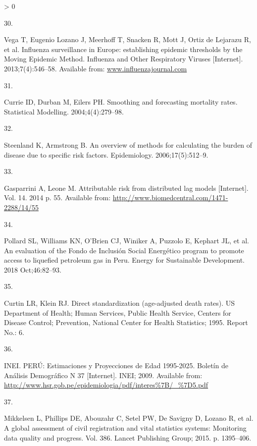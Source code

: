 \documentclass[
]{article}
\newlength{\cslhangindent}
\newlength{\csllabelwidth}
\newenvironment{CSLReferences}[2] %
 {%
  \setlength{\parindent}{0pt}
  \ifodd #1 \everypar{\setlength{\hangindent}{\cslhangindent}}\ignorespaces\fi
  \ifnum #2 > 0
  \setlength{\parskip}{#2\baselineskip}
  \fi
 }%
 {}
\newcommand{\CSLLeftMargin}[1]{\parbox[t]{\csllabelwidth}{#1}}
\newcommand{\CSLRightInline}[1]{\parbox[t]{\linewidth - \csllabelwidth}{#1}\break}
\begin{document}
\begin{CSLReferences}{0}{0}
\leavevmode\hypertarget{ref-Vega2013}{}%
\CSLLeftMargin{30. }
\CSLRightInline{Vega T, Eugenio Lozano J, Meerhoff T, Snacken R, Mott J, Ortiz de Lejarazu R, et al. {Influenza surveillance in Europe: establishing epidemic thresholds by the Moving Epidemic Method}. Influenza and Other Respiratory Viruses {[}Internet{]}. 2013;7(4):546--58. Available from: \href{https://www.influenzajournal.com}{www.influenzajournal.com}}

\leavevmode\hypertarget{ref-Currie2004}{}%
\CSLLeftMargin{31. }
\CSLRightInline{Currie ID, Durban M, Eilers PH. {Smoothing and forecasting mortality rates}. Statistical Modelling. 2004;4(4):279--98. }

\leavevmode\hypertarget{ref-Steenland2006}{}%
\CSLLeftMargin{32. }
\CSLRightInline{Steenland K, Armstrong B. {An overview of methods for calculating the burden of disease due to specific risk factors}. Epidemiology. 2006;17(5):512--9. }

\leavevmode\hypertarget{ref-Gasparrini2014}{}%
\CSLLeftMargin{33. }
\CSLRightInline{Gasparrini A, Leone M. {Attributable risk from distributed lag models} {[}Internet{]}. Vol. 14. 2014 p. 55. Available from: \url{http://www.biomedcentral.com/1471-2288/14/55}}

\leavevmode\hypertarget{ref-Pollard2018}{}%
\CSLLeftMargin{34. }
\CSLRightInline{Pollard SL, Williams KN, O'Brien CJ, Winiker A, Puzzolo E, Kephart JL, et al. {An evaluation of the Fondo de Inclusi{ó}n Social Energ{é}tico program to promote access to liquefied petroleum gas in Peru}. Energy for Sustainable Development. 2018 Oct;46:82--93. }

\leavevmode\hypertarget{ref-Curtin1995}{}%
\CSLLeftMargin{35. }
\CSLRightInline{Curtin LR, Klein RJ. {Direct standardization (age-adjusted death rates)}. US Department of Health; Human Services, Public Health Service, Centers for Disease Control; Prevention, National Center for Health Statistics; 1995. Report No.: 6. }

\leavevmode\hypertarget{ref-INEI2009}{}%
\CSLLeftMargin{36. }
\CSLRightInline{INEI. {PER{Ú}: Estimaciones y Proyecciones de Edad 1995-2025. Bolet{í}n de An{á}lisis Demogr{á}fico N{{}} 37} {[}Internet{]}. INEI; 2009. Available from: \url{http://www.hsr.gob.pe/epidemiologia/pdf/interes\%7B/_\%7D5.pdf}}

\leavevmode\hypertarget{ref-Mikkelsen2015}{}%
\CSLLeftMargin{37. }
\CSLRightInline{Mikkelsen L, Phillips DE, Abouzahr C, Setel PW, De Savigny D, Lozano R, et al. {A global assessment of civil registration and vital statistics systems: Monitoring data quality and progress}. Vol. 386. Lancet Publishing Group; 2015. p. 1395--406. }


\end{CSLReferences}
\end{document}
